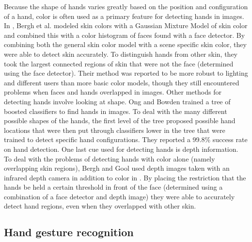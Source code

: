 \documentclass[10pt,twocolumn,letterpaper]{article}
\begin{document}
Because the shape of hands varies greatly based on the position and configuration of a hand, color is often used as a primary feature for detecting hands in images. In \cite{van2009haarlet}, Bergh et al. modeled skin colors with a Gaussian Mixture Model of skin color and combined this with a color histogram of faces found with a face detector. By combining both the general skin color model with a scene specific skin color, they were able to detect skin accurately. To distinguish hands from other skin, they took the largest connected regions of skin that were not the face (determined using the face detector). Their method was reported to be more robust to lighting and different users than more basic color models, though they still encountered problems when faces and hands overlapped in images.
Other methods for detecting hands involve looking at shape. Ong and Bowden \cite{ong2004boosted} trained a tree of boosted classifiers to find hands in images. To deal with the many different possible shapes of the hands, the first level of the tree proposed possible hand locations that were then put through classifiers lower in the tree that were trained to detect specific hand configurations. They reported a 99.8\% success rate on hand detection.
One last cue used for detecting hands is depth information. To deal with the problems of detecting hands with color alone (namely overlapping skin regions), Bergh and Gool used depth images taken with an infrared depth camera in addition to color in \cite{van2011combining}. By placing the restriction that the hands be held a certain threshold in front of the face (determined using a combination of a face detector and depth image) they were able to accurately detect hand regions, even when they overlapped with other skin.

\subsection{Hand gesture recognition}
\end{document}
